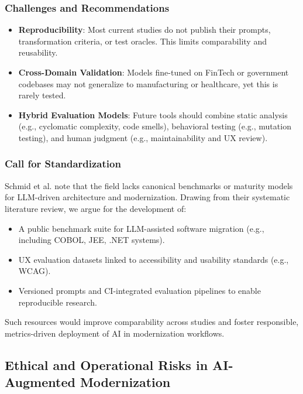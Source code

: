 \documentclass[12pt]{article}
\begin{document}
\subsubsection{Challenges and Recommendations}

\begin{itemize}
    \item \textbf{Reproducibility}: Most current studies do not publish their prompts, transformation criteria, or test oracles. This limits comparability and reusability.
    \item \textbf{Cross-Domain Validation}: Models fine-tuned on FinTech or government codebases may not generalize to manufacturing or healthcare, yet this is rarely tested.
    \item \textbf{Hybrid Evaluation Models}: Future tools should combine static analysis (e.g., cyclomatic complexity, code smells), behavioral testing (e.g., mutation testing), and human judgment (e.g., maintainability and UX review).
\end{itemize}

\subsubsection{Call for Standardization}

Schmid et al. \cite{schmid2025} note that the field lacks canonical benchmarks or maturity models for LLM-driven architecture and modernization. Drawing from their systematic literature review, we argue for the development of:
\begin{itemize}
    \item A public benchmark suite for LLM-assisted software migration (e.g., including COBOL, JEE, .NET systems).
    \item UX evaluation datasets linked to accessibility and usability standards (e.g., WCAG).
    \item Versioned prompts and CI-integrated evaluation pipelines to enable reproducible research.
\end{itemize}

Such resources would improve comparability across studies and foster responsible, metrics-driven deployment of AI in modernization workflows.

\subsection{Ethical and Operational Risks in AI-Augmented Modernization}
\end{document}
